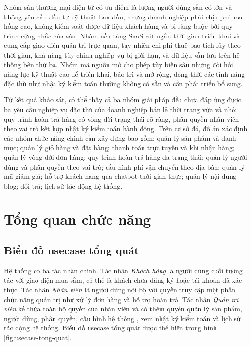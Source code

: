 \documentclass[../DoAn.tex]{subfiles}
\begin{document}
  Nhóm sàn thương mại điện tử có ưu điểm là lượng người dùng sẵn có lớn và không
  yêu cầu đầu tư kỹ thuật ban đầu, nhưng doanh nghiệp phải chịu phí hoa hồng cao,
  không kiểm soát được dữ liệu khách hàng và bị ràng buộc bởi quy trình cứng nhắc
  của sàn. Nhóm nền tảng SaaS rút ngắn thời gian triển khai và cung cấp giao diện
  quản trị trực quan, tuy nhiên chi phí thuê bao tích lũy theo thời gian, khả năng
  tùy chỉnh nghiệp vụ bị giới hạn, và dữ liệu vẫn lưu trên hệ thống bên thứ ba.
  Nhóm mã nguồn mở cho phép tùy biến sâu nhưng đòi hỏi năng lực kỹ thuật cao để
  triển khai, bảo trì và mở rộng, đồng thời các tính năng đặc thù như nhật ký kiểm
  toán thường không có sẵn và cần phát
  triển bổ sung.

  Từ kết quả khảo sát, có thể thấy cả ba nhóm giải pháp đều chưa đáp ứng được ba
  yêu cầu nghiệp vụ đặc thù của doanh nghiệp bán lẻ thời trang vừa và nhỏ: quy
  trình hoàn trả hàng có vòng đời trạng thái rõ ràng, phân quyền nhân viên theo vai
  trò kết hợp nhật ký kiểm toán hành động. Trên cơ sở đó, đồ án xác định các nhóm chức năng chính cần xây
  dựng bao gồm: quản lý sản phẩm và danh mục; quản lý giỏ hàng và
  đặt hàng; thanh toán trực tuyến và khi nhận hàng; quản lý vòng đời đơn hàng;
  quy trình hoàn trả hàng đa trạng thái; quản lý người dùng và phân quyền theo vai
  trò; cấu hình phí vận chuyển theo địa bàn; quản lý mã giảm giá; hỗ trợ khách
  hàng qua chatbot thời gian thực; quản lý nội dung blog; đổi trả; lịch sử tác động hệ thống.

  \section{Tổng quan chức năng}
  \label{section:2.2}

  \subsection{Biểu đồ usecase tổng quát}
  \label{subsection:2.2.1}

  Hệ thống có ba tác nhân chính. Tác nhân \textit{Khách hàng} là người
  dùng cuối tương tác với giao diện mua sắm, có thể là khách chưa đăng ký
  hoặc tài khoản đã xác thực. Tác nhân \textit{Nhân viên} là người dùng nội bộ với
  quyền truy cập một phần chức năng quản trị như xử lý đơn hàng và hỗ trợ hoàn trả.
  Tác nhân \textit{Quản trị viên} kế thừa toàn bộ quyền của nhân viên và có thêm
  quyền quản lý sản phẩm, người dùng, phân quyền, cấu hình hệ thống , xem nhật ký
  kiểm toán và lịch sử tác động hệ thống. Biểu đồ usecase tổng quát được thể hiện trong hình
  \ref{fig:usecase-tong-quat}.
\end{document}
